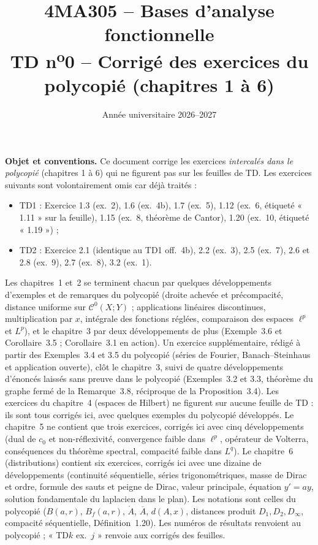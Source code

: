 \documentclass[11pt,a4paper]{article}
\title{\textbf{4MA305 -- Bases d'analyse fonctionnelle}\\[2mm]
\Large TD n\textsuperscript{o}0 -- Corrigé des exercices du polycopié (chapitres 1 à 6)}
\author{}
\date{Année universitaire 2026--2027}
\newcommand{\interieur}[1]{\mathring{#1}}
\newcommand{\adh}[1]{\overline{#1}}
\newcommand{\Bf}{B_f}
\newcommand{\Cz}{\mathcal{C}^0}
\theoremstyle{definition}
\begin{document}
\maketitle

\begin{commentaire}
\textbf{Objet et conventions.} Ce document corrige les exercices \emph{intercalés dans le polycopié} (chapitres 1 à 6) qui ne figurent pas sur les feuilles de TD. Les exercices suivants sont volontairement omis car déjà traités :
\begin{itemize}
  \item TD1 : Exercice 1.3 (ex.~2), 1.6 (ex.~4b), 1.7 (ex.~5), 1.12 (ex.~6, étiqueté « 1.11 » sur la feuille), 1.15 (ex.~8, théorème de Cantor), 1.20 (ex.~10, étiqueté « 1.19 ») ;
  \item TD2 : Exercice 2.1 (identique au TD1 off.~4b), 2.2 (ex.~3), 2.5 (ex.~7), 2.6 et 2.8 (ex.~9), 2.7 (ex.~8), 3.2 (ex.~1).
\end{itemize}
Les chapitres~1 et~2 se terminent chacun par quelques développements d'exemples et de remarques du polycopié (droite achevée et précompacité, distance uniforme sur $\Cz(X;Y)$ ; applications linéaires discontinues, multiplication par $x$, intégrale des fonctions réglées, comparaison des espaces $\ell^p$ et $L^p$), et le chapitre~3 par deux développements de plus (Exemple~3.6 et Corollaire~3.5 ; Corollaire~3.1 en action). Un exercice supplémentaire, rédigé à partir des Exemples~3.4 et 3.5 du polycopié (séries de Fourier, Banach--Steinhaus et application ouverte), clôt le chapitre~3, suivi de quatre développements d'énoncés laissés sans preuve dans le polycopié (Exemples~3.2 et 3.3, théorème du graphe fermé de la Remarque~3.8, réciproque de la Proposition~3.4). Les exercices du chapitre~4 (espaces de Hilbert) ne figurent sur aucune feuille de TD : ils sont tous corrigés ici, avec quelques exemples du polycopié développés. Le chapitre~5 ne contient que trois exercices, corrigés ici avec cinq développements (dual de $c_0$ et non-réflexivité, convergence faible dans $\ell^p$, opérateur de Volterra, conséquences du théorème spectral, compacité faible dans $L^q$). Le chapitre~6 (distributions) contient six exercices, corrigés ici avec une dizaine de développements (continuité séquentielle, séries trigonométriques, masse de Dirac et ordre, formule des sauts et peigne de Dirac, valeur principale, équation $y'=ay$, solution fondamentale du laplacien dans le plan). Les notations sont celles du polycopié ($B(a,r)$, $\Bf(a,r)$, $\interieur{A}$, $\adh{A}$, $d(A,x)$, distances produit $D_1,D_2,D_\infty$, compacité séquentielle, Définition~1.20). Les numéros de résultats renvoient au polycopié ; « TD$k$ ex.~$j$ » renvoie aux corrigés des feuilles.
\end{commentaire}
\end{document}
